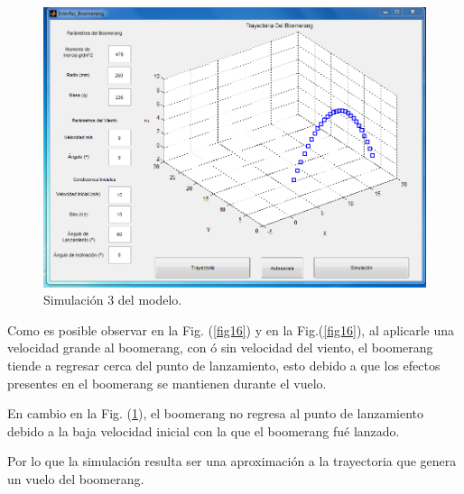 		\begin{figure}[h]
		\begin{center}
		\includegraphics[scale=0.45]{imagenes/3-boomerang/tray_3.png}
		\caption{Simulación 3 del modelo.}
		\label{fig18}
		\end{center}
		\end{figure}

\newpage
	Como es posible observar en la Fig. (\ref{fig16}) y en la Fig.(\ref{fig16}), al aplicarle una velocidad grande al boomerang, con ó sin velocidad del viento, el boomerang tiende a regresar cerca del punto de lanzamiento, esto debido a que los efectos presentes en el boomerang se mantienen durante el vuelo.

	En cambio en la Fig. (\ref{fig18}), el boomerang no regresa al punto de lanzamiento debido a la baja velocidad inicial con la que el boomerang fué lanzado.

	Por lo que la simulación resulta ser una aproximación a la trayectoria que genera un vuelo del boomerang.
